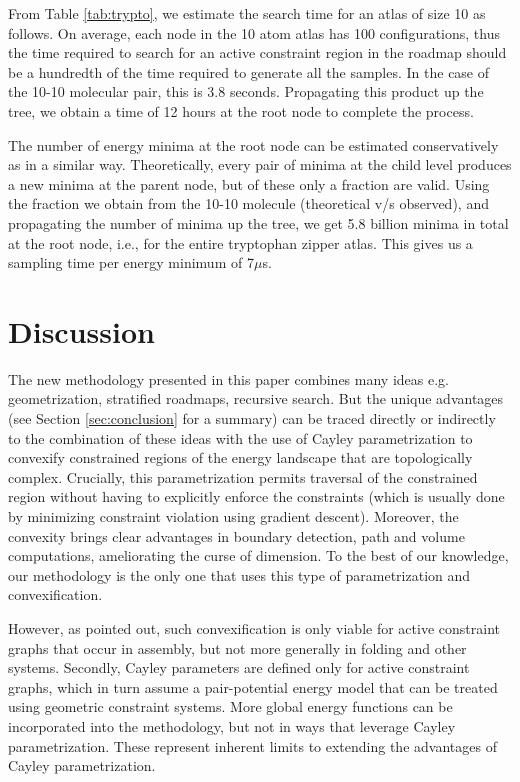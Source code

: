 \documentclass[]{article}
\begin{document}
From Table \ref{tab:trypto}, we estimate the search time for an atlas of
size 10 as follows. On average, each node in the 10 atom atlas has 100
configurations, thus the time required to search for an active constraint
region in the roadmap should be a hundredth of the time required to generate all the samples.
In the case of the 10-10 molecular pair, this is 3.8 seconds. 
Propagating this product up the tree, we obtain a time of 12 hours at the root
node to complete the process.

The number of energy minima at the root node can be estimated conservatively as in a similar
way. Theoretically, every pair of minima at the child level produces a new
minima at the parent node, but of these only a fraction are valid.
Using the fraction we obtain from the 10-10 molecule (theoretical v/s
observed), and propagating the number of minima up the tree, we get 5.8 billion
minima in total at the root node, i.e., for the entire tryptophan zipper atlas. 
This gives us a sampling time per energy minimum of 7$\mu$s.
 \section{Discussion}
\label{sec:discussion}
The new methodology presented in this paper combines many ideas e.g.
geometrization, stratified roadmaps, recursive search. But the unique
advantages (see Section \ref{sec:conclusion} for a summary) can be traced
directly or indirectly to the combination of these ideas with the use of Cayley
parametrization to convexify constrained regions of the energy landscape that
are topologically complex. Crucially, this parametrization permits traversal of
the constrained region without having to explicitly enforce the constraints
(which is usually done by minimizing constraint violation using gradient
descent). Moreover, the convexity brings clear advantages in boundary
detection, path and volume computations, ameliorating the curse of dimension.
To the best of our knowledge, our methodology is the only one that uses this
type of parametrization and convexification.

However, as pointed out, such convexification is only viable for active
constraint graphs that occur in assembly, but not more generally in folding and
other systems. Secondly, Cayley parameters are defined only for active
constraint graphs, which in turn assume a pair-potential energy model that can
be treated using geometric constraint systems. More global energy functions can
be incorporated into the methodology, but not in ways that leverage Cayley
parametrization.  These represent inherent limits to extending the advantages
of Cayley parametrization.
\end{document}
